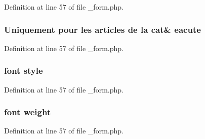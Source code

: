Definition at line 57 of file \-\_\-form.\-php.

\hypertarget{backend_2modules_2news_2templates_2__form_8php_a5cb19caf4ca71c9a14632775d9bd5015}{
\subsubsection[{eacute}]{\setlength{\rightskip}{0pt plus 5cm}Uniquement pour les articles de la cat\& eacute}}\label{backend_2modules_2news_2templates_2__form_8php_a5cb19caf4ca71c9a14632775d9bd5015}


Definition at line 57 of file \-\_\-form.\-php.

\hypertarget{backend_2modules_2news_2templates_2__form_8php_a8ba9b58991c02462588258e164fe3f84}{
\subsubsection[{style}]{\setlength{\rightskip}{0pt plus 5cm}font style}}\label{backend_2modules_2news_2templates_2__form_8php_a8ba9b58991c02462588258e164fe3f84}


Definition at line 57 of file \-\_\-form.\-php.

\hypertarget{backend_2modules_2news_2templates_2__form_8php_a9b9780cce21a0de7f2a4efdab697bc39}{
\subsubsection[{weight}]{\setlength{\rightskip}{0pt plus 5cm}font weight}}\label{backend_2modules_2news_2templates_2__form_8php_a9b9780cce21a0de7f2a4efdab697bc39}


Definition at line 57 of file \-\_\-form.\-php.

